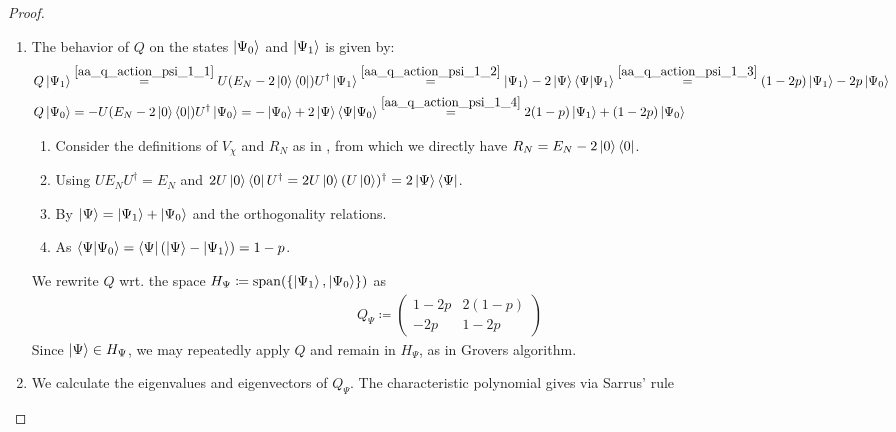 \begin{proof}
    \begin{enumerate}[label=(\roman*)]
        \item \label{aa_iteration_proof_1} The behavior of \(Q\) on the states \(\ket{\Psi_0}\) and \(\ket{\Psi_1}\) is given by:
        \begin{align}
            Q\ket{\Psi_1} &\overset{\ref{aa_q_action_psi_1_1}}{=} U(E_N-2\ket{0}\bra{0})U^\dagger\ket{\Psi_1} \overset{\ref{aa_q_action_psi_1_2}}{=}\ket{\Psi_1} - 2\ket{\Psi}\bra{\Psi}\ket{\Psi_1} \overset{\ref{aa_q_action_psi_1_3}}{=} (1-2p)\ket{\Psi_1} - 2p \ket{\Psi_0}\\
            Q\ket{\Psi_0} &= -U(E_N-2\ket{0}\bra{0})U^\dagger\ket{\Psi_0} = -\ket{\Psi_0} + 2\ket{\Psi}\bra{\Psi}\ket{\Psi_0} \overset{\ref{aa_q_action_psi_1_4}}{=} 2(1-p)\ket{\Psi_1} + (1-2p)\ket{\Psi_0}
        \end{align}
        \begin{enumerate}[label=(\arabic*), wide]
            \item \label{aa_q_action_psi_1_1} Consider the definitions of \(V_\chi\) and \(R_N\) as in , from which we directly have \(R_N = E_N-2\ket{0}\bra{0}\).
            \item \label{aa_q_action_psi_1_2} Using \(UE_NU^\dagger=E_N\) and \(2U\ket{0}\bra{0}U^\dagger = 2U\ket{0}(U\ket{0})^\dagger = 2\ket{\Psi}\bra{\Psi}\).
            \item \label{aa_q_action_psi_1_3} By \(\ket{\Psi} = \ket{\Psi_1} + \ket{\Psi_0}\) and the orthogonality relations.
            \item \label{aa_q_action_psi_1_4} As \(\bra{\Psi}\ket{\Psi_0} = \bra{\Psi}(\ket{\Psi}-\ket{\Psi_1}) = 1-p\).
        \end{enumerate}
        We rewrite \(Q\) wrt. the space \(H_\Psi \coloneqq \operatorname{span}(\{\ket{\Psi_1}, \ket{\Psi_0}\})\) as
        \begin{align}
            Q_\Psi \coloneqq \begin{pmatrix}
                1-2p & 2(1-p)\\
                 -2p & 1-2p
            \end{pmatrix}
        \end{align}
        Since \(\ket{\Psi} \in H_\Psi\), we may repeatedly apply \(Q\) and remain in \(H_\Psi\), as in Grovers algorithm.
        \item \label{aa_iteration_proof_2} We calculate the eigenvalues and eigenvectors of \(Q_\Psi\). The characteristic polynomial gives via Sarrus' rule

\end{enumerate}
\end{proof}
